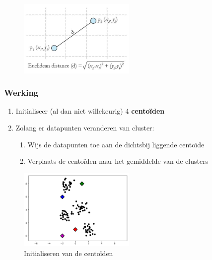 \documentclass{article}
\begin{document}
\begin{figure}[H]
    \centering
    \includegraphics[width=0.5\textwidth]{k-means-euclidische-afstand.png}
\end{figure}

\subsubsection{Werking}

\begin{enumerate}
    \item Initialiseer (al dan niet willekeurig) 4 \textbf{centoïden}
    \item Zolang er datapunten veranderen van cluster:
    \begin{enumerate}
        \item Wijs de datapunten toe aan de dichtsbij liggende centoïde 
        \item Verplaats de centoïden naar het gemiddelde van de clusters
    \end{enumerate}
\end{enumerate}

\begin{figure}[H]
    \centering
    \includegraphics[width=0.5\textwidth]{k-means-2.png}
    \caption{Initialiseren van de centoïden}
\end{figure}
\end{document}
